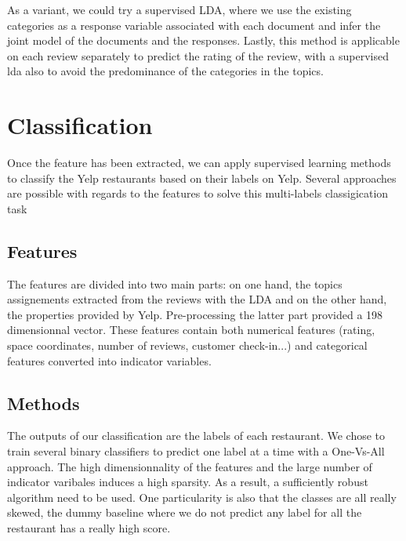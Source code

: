\documentclass[paper=a4, fontsize=11pt]{scrartcl} %
\numberwithin{equation}{section}
\numberwithin{figure}{section}
\numberwithin{table}{section}
\begin{document}
As a variant, we could try a supervised LDA, where we use the existing categories as a response variable associated with each document and infer the joint model of the documents and the responses. Lastly, this method is applicable on each review separately to predict the rating of the review, with a supervised lda also to avoid the predominance of the categories in the topics.


\section{Classification}

Once the feature has been extracted, we can apply supervised learning methods to classify the Yelp restaurants based on their labels on Yelp. Several approaches are possible with regards to the features to solve this multi-labels classigication task

\subsection*{Features}

The features are divided into two main parts: on one hand, the topics assignements extracted from the reviews with the LDA and on the other hand, the properties provided by Yelp. Pre-processing the latter part provided a 198 dimensionnal vector. These features contain both numerical features (rating, space coordinates, number of reviews, customer check-in...) and categorical features converted into indicator variables.

\subsection*{Methods}

The outputs of our classification are the labels of each restaurant. We chose to train several binary classifiers to predict one label at a time with a One-Vs-All approach. The high dimensionnality of the features and the large number of indicator varibales induces a high sparsity. As a result, a sufficiently robust algorithm need to be used. One particularity is also that the classes are all really skewed, the dummy baseline where we do not predict  any label for all the restaurant has a really high score.\\
\end{document}

